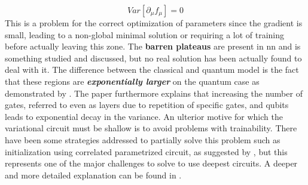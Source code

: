 \begin{equation}\label{barren plateau}
	Var[\partial_\mu f_\mu] = 0
\end{equation} 
This is a problem for the correct optimization of parameters since the gradient is small, leading to a non-global minimal solution or requiring a lot of training before actually leaving this zone. The \textbf{barren plateaus} are present in \acrlong{nn} and is something studied and discussed, but no real solution has been actually found to deal with it.
The difference between the classical and quantum model is the fact that these regions are \textbf{\textit{exponentially larger}} on the quantum case as demonstrated by \cite{McClean_2018}. The paper furthermore explains that increasing the number of gates, referred to even as layers due to repetition of specific gates, and qubits leads to exponential decay in the variance. An ulterior motive for which the variational circuit must be shallow is to avoid problems with trainability. There have been some strategies addressed to partially solve this problem such as initialization using correlated parametrized circuit, as suggested by \cite{Grant_2019}, but this represents one of the major challenges to solve to use deepest circuits. A deeper and more detailed explanation can be found in \cite{Schuld2021vqa}.

